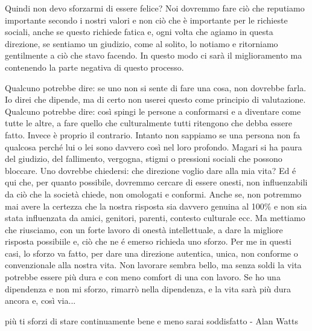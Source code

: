 \documentclass[12pt]{book} %
\begin{document}
Quindi non devo sforzarmi di essere felice? Noi dovremmo fare ciò che reputiamo importante secondo i nostri valori e non ciò che
è importante per le richieste sociali, anche se questo richiede fatica e, ogni volta che agiamo in questa direzione, se
sentiamo un giudizio, come al solito, lo notiamo e ritorniamo gentilmente a ciò che stavo facendo. In questo modo ci sarà il
miglioramento ma contenendo la parte negativa di questo processo. 

Qualcuno potrebbe dire: se uno non si sente di fare una cosa, non dovrebbe farla.
Io direi che dipende, ma di certo non userei questo come principio di valutazione.
Qualcuno potrebbe dire: così spingi le persone a conformarsi e a diventare come tutte le altre, a fare quello che culturalmente tutti ritengono che debba essere fatto. Invece è proprio il contrario.
Intanto non sappiamo se una persona non fa qualcosa perché lui o lei sono davvero così nel loro profondo. Magari si ha paura del giudizio, del fallimento, vergogna, stigmi o pressioni sociali che possono bloccare.
Uno dovrebbe chiedersi: che direzione voglio dare alla mia vita? Ed é qui che, per quanto possibile, dovremmo cercare di essere onesti, non influenzabili da ciò che la società chiede, non omologati e conformi. Anche se, non potremmo mai avere la certezza che la nostra risposta sia davvero genuina al 100\% e non sia stata influenzata da amici, genitori, parenti, contesto culturale ecc. Ma mettiamo che riusciamo, con un forte lavoro di onestà intellettuale, a dare la migliore risposta possibiile e, ciò che ne é emerso richieda uno sforzo. Per me in questi casi, lo sforzo va fatto, per dare una direzione autentica, unica, non conforme o convenzionale alla nostra vita. 
Non lavorare sembra bello, ma senza soldi la vita potrebbe essere più dura e con meno comfort di una con lavoro. Se ho una dipendenza e non mi sforzo, rimarrò nella dipendenza, e la vita sarà più dura ancora e, così via...

più ti sforzi di stare continuamente bene e meno sarai soddisfatto - Alan Watts


\bigskip
\end{document}
